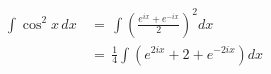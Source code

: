 \begin{align} \int \cos^2 x \, dx \,&=\, \int \left(\frac{e^{ix}+e^{-ix}}{2}\right)^2 dx \\[6pt] &=\, \frac14\int \left( e^{2ix} + 2 +e^{-2ix} \right) dx \end{align}
